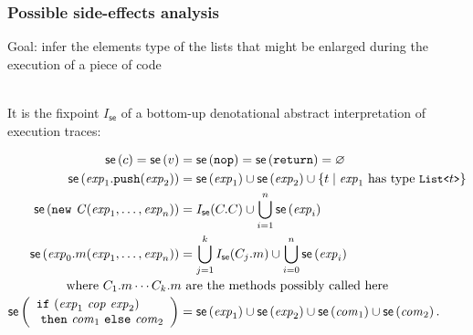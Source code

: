 \documentclass[11pt]{beamer}  %
\def\|#1|{\mathid{#1}}
\newcommand{\mathid}[1]{\ensuremath{\mathit{#1}}}
\def\codesize{\small}
\def\<#1>{\codeid{#1}}
\newcommand{\codeid}[1]{\ifmmode{\mbox{\codesize\ttfamily{#1}}}\else{\codesize\ttfamily #1}\fi}
\renewcommand{\exp}{\|exp|}
\newcommand{\com}{\|com|}
\newcommand{\new}[2]{\mathtt{new}\ \mathit{#1}\mathtt{(}{#2}\mathtt{)}}
\newcommand{\call}[3]{{#1}\mathtt{.}{#2}\mathtt{(}{#3}\mathtt{)}}
\newcommand{\push}[2]{{#1}\mathtt{.push(}{#2}\mathtt{)}}
\newcommand{\nop}{\mathtt{nop}}
\newcommand{\return}{\mathtt{return}}
\newcommand{\ifetwo}[4]{\begin{array}{l}
    \mathtt{if\ (}{#1}\ \mathit{cop}\ {#2}\mathtt{)}\\
    \mathtt{\ then\ }{#3}\mathtt{\ else\ }{#4}
\end{array}}
\newcommand{\sideeffect}[1]{\mathsf{se}\left({#1}\right)}
\newcommand{\intsideeffect}{I_{\mathsf{se}}}
\begin{document}
\begin{frame}\frametitle{Possible side-effects analysis}

  \begin{mdframed}[backgroundcolor=blue!20] 
  Goal: infer the elements type of the lists that might be enlarged
  during the execution of a piece of code
  \end{mdframed}

  \mbox{}\\

  It is the fixpoint $\intsideeffect$ of a bottom-up denotational abstract interpretation of execution traces:

  {\scriptsize
  \begin{align*}
      \sideeffect{c}=\sideeffect{v}&=\sideeffect{\nop}=\sideeffect{\return}=\varnothing\\
      \sideeffect{\push{\exp_1}{\exp_2}}&=\sideeffect{\exp_1}\cup\sideeffect{\exp_2}\cup
      \{t\mid\exp_1\text{ has type }\<List<>t\<\text{>}>\}\\
      \sideeffect{\new{C}{\exp_1,\ldots,\exp_n}}&=\intsideeffect(C.C)\cup\bigcup_{i=1}^n\sideeffect{\exp_i}\\
      \sideeffect{\call{\exp_0}{m}{\exp_1,\ldots,\exp_n}}&=\bigcup_{j=1}^k\intsideeffect(C_j.m)\cup\bigcup_{i=0}^n\sideeffect{\exp_i}\\
      \noalign{\centering\text{where $C_1.m\cdots C_k.m$ are the methods possibly called here}}
      \sideeffect{\ifetwo{\exp_1}{\exp_2}{\com_1}{\com_2}}&=\sideeffect{\exp_1}\cup\sideeffect{\exp_2}\cup\sideeffect{\com_1}\cup\sideeffect{\com_2}.
  \end{align*}
  }

\end{frame}
\end{document}
